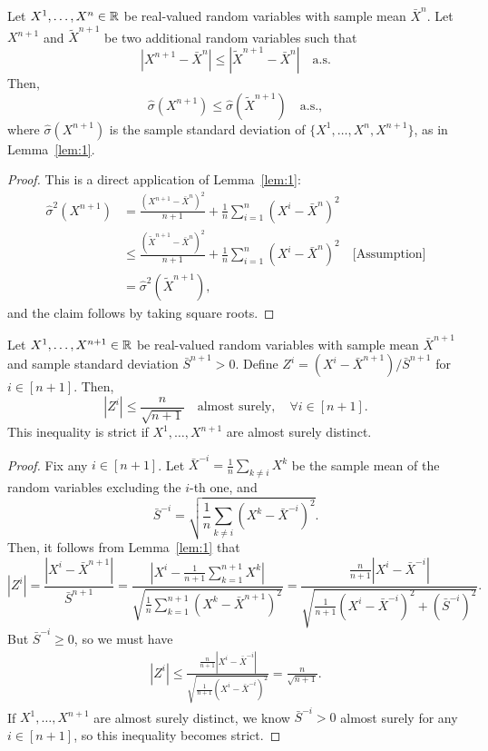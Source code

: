 \begin{lemma}\label{lem:2}
    Let $X^1,\ldots, X^n \in \mathbb{R}$ be real-valued random variables with sample mean $\bar{X}^n$. Let $X^{n+1}$ and $\tilde{X}^{n+1}$ be two additional random variables such that
    \[
    |X^{n+1} - \bar{X}^n| \leq |\tilde{X}^{n+1}-\bar{X}^n| \quad \text{a.s.}
    \]
    Then,
    \[
    \hat{\sigma}(X^{n+1}) \leq \hat{\sigma}(\tilde{X}^{n+1}) \quad \text{a.s.},
    \]
    where $\hat{\sigma}(X^{n+1})$ is the sample standard deviation of $\{X^1,\ldots,X^n, X^{n+1}\}$, as in Lemma~\ref{lem:1}.
\end{lemma}
\begin{proof}
    This is a direct application of Lemma~\ref{lem:1}:
\begin{align*}
    \hat{\sigma}^2(X^{n+1}) 
    &= \frac{(X^{n+1}-\bar{X}^{n})^2}{n+1}+\frac{1}{n}\sum^n_{i=1}(X^i-\bar{X}^{n})^2\\
    &\leq \frac{(\tilde{X}^{n+1}-\bar{X}^{n})^2}{n+1}+\frac{1}{n}\sum^n_{i=1}(X^i-\bar{X}^{n})^2 \quad \text{[Assumption]}\\
    &=\hat{\sigma}^2(\tilde{X}^{n+1}),
\end{align*}
and the claim follows by taking square roots.
\end{proof}


\begin{lemma}\label{lem:3}
    Let $X^1,\ldots, X^{n+1} \in \mathbb{R}$ be real-valued random variables with sample mean $\bar{X}^{n+1}$ and sample standard deviation $\bar{S}^{n+1} > 0$. Define $Z^i = (X^i-\bar{X}^{n+1}) / \bar{S}^{n+1}$ for $i \in [n+1]$. Then,
    \[
    |Z^i| \leq \frac{n}{\sqrt{n+1}} \quad\text{almost surely}, \quad \forall i \in [n+1].
    \]
    This inequality is strict if $X^1,\ldots,X^{n+1}$ are almost surely distinct.
\end{lemma}
\begin{proof}
Fix any $i\in [n+1]$.
Let $\bar{X}^{-i} = \frac{1}{n}\sum_{k\neq i}X^k$ be the sample mean of the random variables excluding the $i$-th one, and
\[
\bar{S}^{-i} = \sqrt{\frac{1}{n}\sum_{k\neq i}(X^k - \bar{X}^{-i})^2}.
\]
Then, it follows from Lemma~\ref{lem:1} that
\[
|Z^i| = \frac{|X^i-\bar{X}^{n+1}|}{\bar{S}^{n+1}}
    = \frac{\left|X^i - \frac{1}{n+1}\sum^{n+1}_{k=1}X^k\right|}{\sqrt{\frac{1}{n}\sum^{n+1}_{k=1}(X^k - \bar{X}^{n+1})^2}}=\frac{\frac{n}{n+1}|X^i - \bar{X}^{-i}|}{\sqrt{\frac{1}{n+1}(X^i-\bar{X}^{-i})^2+(\bar{S}^{-i})^2}}.
\]
But $\bar{S}^{-i} \geq 0$, so we must have
\begin{align*}
    |Z^i|\leq \frac{\frac{n}{n+1}|X^i - \bar{X}^{-i}|}{\sqrt{\frac{1}{n+1}(X^i-\bar{X}^{-i})^2}}= \frac{n}{\sqrt{n+1}}.
\end{align*}
If $X^1,\ldots,X^{n+1}$ are almost surely distinct, we know $\bar{S}^{-i} >0$ almost surely for any $i \in [n+1]$, so this inequality becomes strict.
\end{proof}


